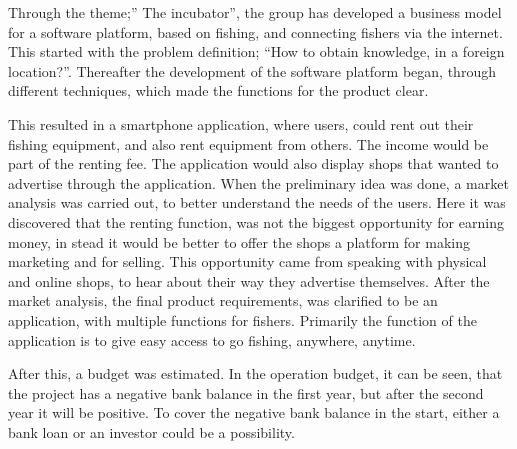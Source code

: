 \vspace{1cm}
\begin{center}
\begin{minipage}{0.5\textwidth}
Through the theme;” The incubator”, the group has developed a business model for a software platform, based on fishing, and connecting fishers via the internet. This started with the problem definition; “How to obtain knowledge, in a foreign location?”. 
Thereafter the development of the software platform began, through different techniques, which made the functions for the product clear. 

This resulted in a smartphone application, where users, could rent out their fishing equipment, and also rent equipment from others. The income would be part of the renting fee. The application would also display shops that wanted to advertise through the application. When the preliminary idea was done, a market analysis was carried out, to better understand the needs of the users. 
Here it was discovered that the renting function, was not the biggest opportunity for earning money, in stead it would be better to offer the shops a platform for making marketing and for selling. This opportunity came from speaking with physical and online shops, to hear about their way they advertise themselves. After the market analysis, the final product requirements, was clarified to be an application, with multiple functions for fishers. Primarily the function of the application is to give easy access to go fishing, anywhere, anytime.


After this, a budget was estimated. In the operation budget, it can be seen, that the project has a negative bank balance in the first year, but after the second year it will be positive. To cover the negative bank balance in the start, either a bank loan or an investor could be a possibility. 
\end{minipage}	
\end{center}
